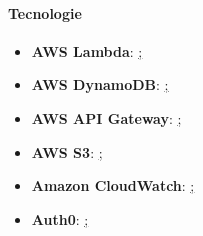 \paragraph{Tecnologie}
\begin{itemize}
\item \textbf{AWS Lambda}: \href{https://aws.amazon.com/it/lambda/?nc2=h_ql_prod_fs_lbd};
\item \textbf{AWS DynamoDB}: \href{https://aws.amazon.com/it/dynamodb/?nc2=h_ql_prod_db_ddb};
\item \textbf{AWS API Gateway}: \href{https://aws.amazon.com/api-gateway/?nc2=type_a};
\item \textbf{AWS S3}: \href{https://aws.amazon.com/s3/?nc2=type_a};
\item \textbf{Amazon CloudWatch}: \href{https://aws.amazon.com/cloudwatch/?nc2=type_a};
\item \textbf{Auth0}: \href{https://auth0.com/#!};
\end{itemize}